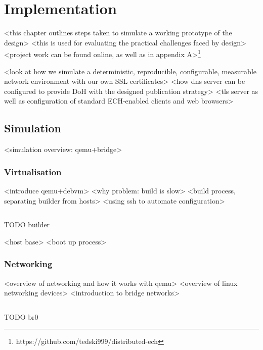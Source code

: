 \chapter{Implementation}\label{Implementation}

<this chapter outlines steps taken to simulate a working prototype of the design>
<this is used for evaluating the practical challenges faced by design>
<project work can be found online, as well as in appendix A>\footnote{https://github.com/tedski999/distributed-ech}

<look at how we simulate a deterministic, reproducible, configurable, measurable network environment with our own SSL certificates>
<how dns server can be configured to provide DoH with the designed publication strategy>
<tls server as well as configuration of standard ECH-enabled clients and web browsers>









\section{Simulation}

<simulation overview: qemu+bridge>

\subsection{Virtualisation}

<introduce qemu+debvm> \cite{bellard2005qemu}
<why problem: build is slow>
<build process, separating builder from hosts>
<using ssh to automate configuration>

\begin{listing}[ht]
\inputminted{bash}{snippets/build.bash}
\caption[Building OpenSSL from source inside build.img with DebVM]{TODO builder}
\end{listing}

<host base>
<boot up process>

\subsection{Networking}

<overview of networking and how it works with qemu>
<overview of linux networking devices>
<introduction to bridge networks>

\begin{listing}[ht]
\inputminted{bash}{snippets/br0.bash}
\caption[Connecting QEMU virtual machines using a network bridge]{TODO br0}
\end{listing}

